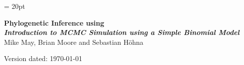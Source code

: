 \documentclass[11pt]{article}
\begin{document}
\renewcommand{\headrulewidth}{0.5pt}
\headsep = 20pt
\lhead{ }

\thispagestyle{plain}
\begin{center}

\textbf{\LARGE Phylogenetic Inference using \RevBayes}\\\vspace{2mm}
\textbf{\it{\Large Introduction to MCMC Simulation using a Simple Binomial Model}}\\\vspace{2mm}
\vspace{1cm}
{\Large Mike May, Brian Moore and Sebastian H{\"o}hna}
\vspace{1cm}
\end{center}

\def \ResourcePath {./}
\def \GlobalResourcePath {../}


Version dated: \today
\end{document}

